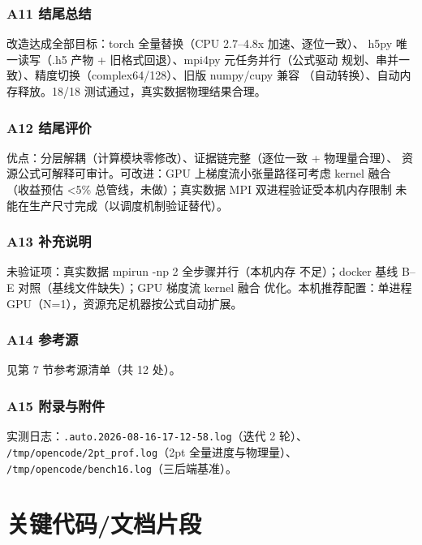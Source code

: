 \documentclass[UTF8]{ctexart}
\begin{document}
\subsubsection{A11 结尾总结}
\begin{conclbox}
改造达成全部目标：torch 全量替换（CPU 2.7--4.8x 加速、逐位一致）、
h5py 唯一读写（.h5 产物 + 旧格式回退）、mpi4py 元任务并行（公式驱动
规划、串并一致）、精度切换（complex64/128）、旧版 numpy/cupy 兼容
（自动转换）、自动内存释放。18/18 测试通过，真实数据物理结果合理。
\end{conclbox}

\subsubsection{A12 结尾评价}
优点：分层解耦（计算模块零修改）、证据链完整（逐位一致 + 物理量合理）、
资源公式可解释可审计。可改进：GPU 上梯度流小张量路径可考虑 kernel 融合
（收益预估 <5\% 总管线，未做）；真实数据 MPI 双进程验证受本机内存限制
未能在生产尺寸完成（以调度机制验证替代）。

\subsubsection{A13 补充说明}
\begin{warnbox}
\textcolor{warn}{未验证}项：真实数据 mpirun -np 2 全步骤并行（本机内存
不足）；docker 基线 B--E 对照（基线文件缺失）；GPU 梯度流 kernel 融合
优化。本机推荐配置：单进程 GPU（N=1），资源充足机器按公式自动扩展。
\end{warnbox}

\subsubsection{A14 参考源}
见第 7 节参考源清单（共 12 处）。

\subsubsection{A15 附录与附件}
实测日志：\texttt{\nolinkurl{.auto.2026-08-16-17-12-58.log}}（迭代 2 轮）、
\texttt{\nolinkurl{/tmp/opencode/2pt_prof.log}}（2pt 全量进度与物理量）、
\texttt{\nolinkurl{/tmp/opencode/bench16.log}}（三后端基准）。

\section{关键代码/文档片段}
\end{document}
